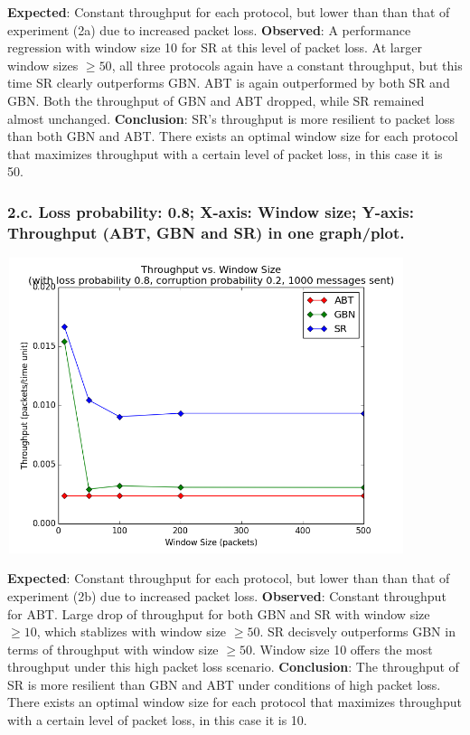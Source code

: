 \documentclass{article}
\begin{document}
\textbf{Expected}: Constant throughput for each protocol, but lower than than that of experiment (2a) due to increased packet loss.
\newline\newline
\textbf{Observed}: A performance regression with window size 10 for SR at this level of packet loss. At larger window sizes $\ge 50$, all three protocols again have a constant throughput, but this time SR clearly outperforms GBN. ABT is again outperformed by both SR and GBN. Both the throughput of GBN and ABT dropped, while SR remained almost unchanged.
\newline\newline
\textbf{Conclusion}: SR's throughput is more resilient to packet loss than both GBN and ABT. There exists an optimal window size for each protocol that maximizes throughput with a certain level of packet loss, in this case it is 50.

\pagebreak

\subsubsection{2.c. Loss probability: 0.8; X-axis: Window size; Y-axis: Throughput (ABT, GBN and SR) in one graph/plot.}

\begin{center}
    \includegraphics[width=330pt,height=245pt]{images/exp2g3.png}
\end{center}

\textbf{Expected}: Constant throughput for each protocol, but lower than than that of experiment (2b) due to increased packet loss.
\newline\newline
\textbf{Observed}: Constant throughput for ABT. Large drop of throughput for both GBN and SR with window size $\ge 10$, which stablizes with window size $\ge 50$. SR decisvely outperforms GBN in terms of throughput with window size $\ge 50$. Window size 10 offers the most throughput under this high packet loss scenario.
\newline\newline
\textbf{Conclusion}: The throughput of SR is more resilient than GBN and ABT under conditions of high packet loss. There exists an optimal window size for each protocol that maximizes throughput with a certain level of packet loss, in this case it is 10.
\end{document}
